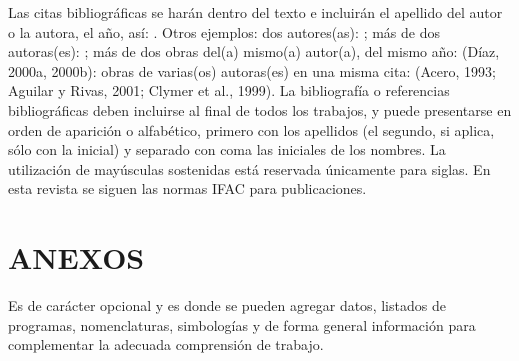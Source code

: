 \documentclass[10pt]{article}
\begin{document}
\begin{multicols}{2}
Las citas bibliográficas se harán dentro del texto e incluirán el apellido del autor o la autora, el año, así: \parencite{ogata2004}. Otros ejemplos: dos autores(as): \parencite{pardo2004}; más de dos autoras(es): \parencite{clymer1992}; más de dos obras del(a) mismo(a) autor(a), del mismo año: (Díaz, 2000a, 2000b): obras de varias(os) autoras(es) en una misma cita: (Acero, 1993; Aguilar y Rivas, 2001; Clymer et al., 1999). La bibliografía o referencias bibliográficas deben incluirse al final de todos los trabajos, y puede presentarse en orden de aparición o alfabético, primero con los apellidos (el segundo, si aplica, sólo con la inicial) y separado con coma las iniciales de los nombres. La utilización de mayúsculas sostenidas está reservada únicamente para siglas. En esta revista se siguen las normas IFAC para publicaciones.

\section{ANEXOS}

Es de carácter opcional y es donde se pueden agregar datos, listados de programas, nomenclaturas, simbologías y de forma general información para complementar la adecuada comprensión de trabajo.

\end{multicols}
\end{document}
